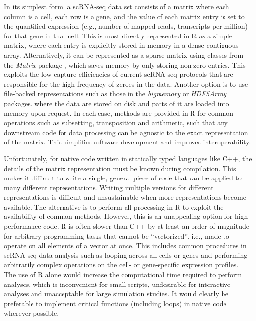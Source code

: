 \documentclass[10pt,letterpaper]{article}
\begin{document}
In its simplest form, a scRNA-seq data set consists of a matrix where each column is a cell, each row is a gene, and the value of each matrix entry is set to the quantified expression (e.g., number of mapped reads, transcripts-per-million) for that gene in that cell.
This is most directly represented in R as a simple matrix, where each entry is explicitly stored in memory in a dense contiguous array.
Alternatively, it can be represented as a sparse matrix using classes from the \textit{Matrix} package \cite{bates2017matrix}, which saves memory by only storing non-zero entries.
This exploits the low capture efficiencies of current scRNA-seq protocols \cite{grun2015design} that are responsible for the high frequency of zeroes in the data.
Another option is to use file-backed representations such as those in the \textit{bigmemory} \cite{kane2013scalable} or \textit{HDF5Array} packages, where the data are stored on disk and parts of it are loaded into memory upon request.
In each case, methods are provided in R for common operations such as subsetting, transposition and arithmetic, such that any downstream code for data processing can be agnostic to the exact representation of the matrix.
This simplifies software development and improves interoperability.

Unfortunately, for native code written in statically typed languages like C++, the details of the matrix representation must be known during compilation.
This makes it difficult to write a single, general piece of code that can be applied to many different representations.
Writing multiple versions for different representations is difficult and unsustainable when more representations become available.
The alternative is to perform all processing in R to exploit the availability of common methods.
However, this is an unappealing option for high-performance code.
R is often slower than C++ by at least an order of magnitude for arbitrary programming tasks that cannot be ``vectorized'', i.e., made to operate on all elements of a vector at once.
This includes common procedures in scRNA-seq data analysis such as looping across all cells or genes and performing arbitrarily complex operations on the cell- or gene-specific expression profiles.
The use of R alone would increase the computational time required to perform analyses, which is inconvenient for small scripts, undesirable for interactive analyses and unacceptable for large simulation studies.
It would clearly be preferable to implement critical functions (including loops) in native code wherever possible.
\end{document}
